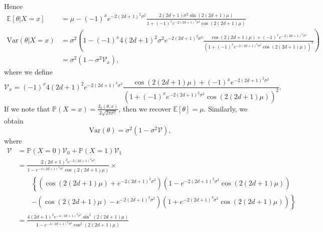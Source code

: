 Hence
\begin{align}
	\mathbb{E}\left[ \theta | X = x \right] & = \mu - \left( -1 \right) ^{x}e^{ - 2\left( 2d+1 \right) ^2 \sigma^2} \frac{2 \left( 2d+1 \right) \sigma^2 \sin \left( 2\left( 2d+1 \right) \mu \right) 	}{1 + \left( -1 \right) ^{x}e^{ - 2 \left( 2d+1 \right) ^2 \sigma^2} \cos\left( 2\left( 2d+1 \right) \mu \right) } \\
	\text{Var}\left( \theta | X= x \right) &= \sigma^2\left( 1 - \left( -1 \right) ^{x}4\left( 2d+1 \right) ^2 \sigma^2 e^{ - 2 \left( 2d+1 \right) ^2 \sigma^2} \frac{\cos\left( 2\left( 2d+1 \right) \mu \right)  + \left( -1 \right) ^{x}e^{ - 2 \left( 2d+1 \right) ^2 \sigma^2}}{\left( 1 + \left( -1 \right) ^{x} e^{- 2 \left( 2d+1 \right) ^2 \sigma^2} \cos \left( 2 \left( 2d+1 \right) \mu \right)  \right) ^2} \right) \\
					       &=\sigma^2 \left( 1 - \sigma^2 \mathcal{V}_x  \right),
\end{align}
where we define
\[
	\mathcal{V}_x = \left( -1 \right) ^{x} 4\left( 2d+1 \right) ^2 e^{ - 2 \left( 2d+1 \right) ^2 \sigma^2} \frac{\cos\left( 2\left( 2d+1 \right) \mu \right) + \left( -1 \right) ^{x} e^{ - 2 \left( 2d+1 \right) ^2 \sigma^2}}{\left( 1 + \left( -1 \right) ^{x} e^{ - 2 \left( 2d+1 \right) ^2 \sigma^2} \cos\left( 2 \left( 2d+1 \right) \mu \right)  \right) ^2}
.\]
If we note that $\mathbb{P}\left( X = x \right) = \frac{I_0\left( \theta, x \right)}{2\sqrt{2 \pi \sigma^2} } $, then we recover $\mathbb{E}[\theta] = \mu$. Similarly, we obtain
\[
	\text{Var}\left( \theta \right) = \sigma^2\left( 1 - \sigma^2 \mathcal{V} \right)
,\]
where
\begin{align*}
	\mathcal{V} &= \mathbb{P}\left( X = 0 \right) \mathcal{V}_0 + \mathbb{P}\left( X = 1 \right) \mathcal{V}_1 \\
		    &= \frac{ 2\left( 2d+1 \right) ^2 e^{ - 2 \left( 2d+1 \right) ^2 \sigma^2}}{1 - e^{ - 4 \left( 2d+1 \right) ^2 \sigma^2} \cos\left( 2\left( 2d+1 \right) \mu \right) } \times \\
		    &	\qquad \left\{   \left( \cos\left( 2 \left( 2d+1 \right) \mu \right) + e^{ - 2 \left( 2d+1 \right) ^2 \sigma^2} \right) \left( 1 - e^{ - 2\left( 2d+1 \right) ^2 \sigma^2}\cos\left( 2\left( 2d+1 \right) \mu \right)  \right) \right. \\
		    & \qquad \left. - \left( \cos\left( 2\left( 2d+1 \right) \mu \right) -e^{- 2 \left( 2d+1 \right) ^2 \sigma^2} \right) \left( 1 + e^{ - 2 \left( 2d+1 \right) ^2 \sigma^2}\cos\left( 2\left( 2d+1 \right) \mu \right)  \right)  \right\} \\
		    &= \frac{4\left( 2d+1 \right) ^2 e^{ - 4\left( 2d+1 \right) ^2 \sigma^2} \sin^2 \left( 2\left( 2d+1 \right) \mu \right) }{1 - e^{ - 4\left( 2d+1 \right) ^2 \sigma^2} \cos^2 \left(  2 \left( 2d+1 \right) \mu \right) }
\end{align*}


